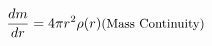 \begin{eqnarray}
    \frac{dm}{dr} = 4\pi r^2 \rho(r) & \textrm{\small  (Mass Continuity)} \\
\end{eqnarray}